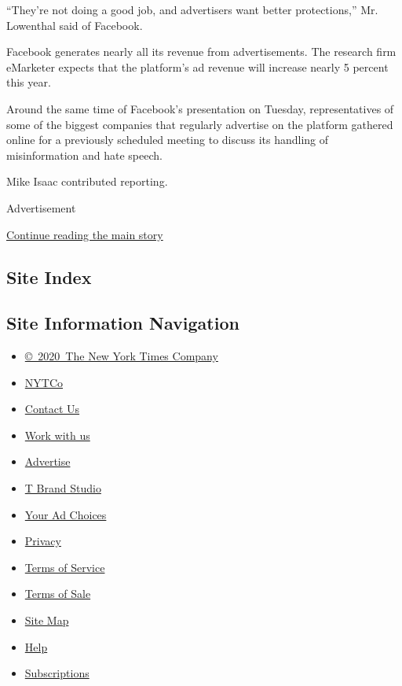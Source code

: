 ``They're not doing a good job, and advertisers want better
protections,'' Mr. Lowenthal said of Facebook.

Facebook generates nearly all its revenue from advertisements. The
research firm eMarketer expects that the platform's ad revenue will
increase nearly 5 percent this year.

Around the same time of Facebook's presentation on Tuesday,
representatives of some of the biggest companies that regularly
advertise on the platform gathered online for a previously scheduled
meeting to discuss its handling of misinformation and hate speech.

Mike Isaac contributed reporting.

Advertisement

\protect\hyperlink{after-bottom}{Continue reading the main story}

\hypertarget{site-index}{%
\subsection{Site Index}\label{site-index}}

\hypertarget{site-information-navigation}{%
\subsection{Site Information
Navigation}\label{site-information-navigation}}

\begin{itemize}
\tightlist
\item
  \href{https://help.nytimes3xbfgragh.onion/hc/en-us/articles/115014792127-Copyright-notice}{©~2020~The
  New York Times Company}
\end{itemize}

\begin{itemize}
\tightlist
\item
  \href{https://www.nytco.com/}{NYTCo}
\item
  \href{https://help.nytimes3xbfgragh.onion/hc/en-us/articles/115015385887-Contact-Us}{Contact
  Us}
\item
  \href{https://www.nytco.com/careers/}{Work with us}
\item
  \href{https://nytmediakit.com/}{Advertise}
\item
  \href{http://www.tbrandstudio.com/}{T Brand Studio}
\item
  \href{https://www.nytimes3xbfgragh.onion/privacy/cookie-policy\#how-do-i-manage-trackers}{Your
  Ad Choices}
\item
  \href{https://www.nytimes3xbfgragh.onion/privacy}{Privacy}
\item
  \href{https://help.nytimes3xbfgragh.onion/hc/en-us/articles/115014893428-Terms-of-service}{Terms
  of Service}
\item
  \href{https://help.nytimes3xbfgragh.onion/hc/en-us/articles/115014893968-Terms-of-sale}{Terms
  of Sale}
\item
  \href{https://spiderbites.nytimes3xbfgragh.onion}{Site Map}
\item
  \href{https://help.nytimes3xbfgragh.onion/hc/en-us}{Help}
\item
  \href{https://www.nytimes3xbfgragh.onion/subscription?campaignId=37WXW}{Subscriptions}
\end{itemize}

